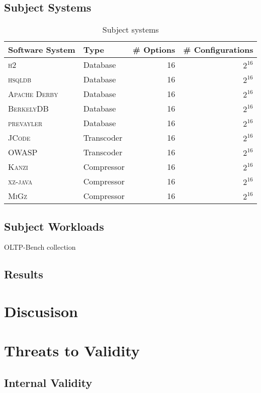 \documentclass[conference]{IEEEtran}
\begin{document}
\subsection{Subject Systems}
\begin{table}
	\centering
	\caption{Subject systems}
	\begin{tabular}{llrr}
		\toprule
		\textbf{Software System} & \textbf{Type} & \textbf{\# Options} & \textbf{\# Configurations} \\
		\midrule
		\textsc{h2} & Database & 16 & $2^{16}$\\
		\textsc{hsqldb} & Database & 16 & $2^{16}$\\
		\textsc{Apache Derby} & Database & 16 & $2^{16}$\\
		\textsc{BerkelyDB} & Database & 16 & $2^{16}$\\
		\textsc{prevayler} & Database & 16 & $2^{16}$\\
		\midrule
		\textsc{JCode} & Transcoder & 16 & $2^{16}$\\
		\textsc{OWASP} & Transcoder & 16 & $2^{16}$\\
		\midrule
		\textsc{Kanzi} & Compressor & 16 & $2^{16}$\\
		\textsc{xz-java} & Compressor & 16 & $2^{16}$\\
		\textsc{MiGz} &  Compressor & 16 & $2^{16}$\\
		\bottomrule
	\end{tabular}
\end{table}

\subsection{Subject Workloads}
OLTP-Bench collection~\cite{difallah_oltp_2013}

\subsection{Results}

\section{Discusison}
\section{Threats to Validity}
\subsection{Internal Validity}
\end{document}
